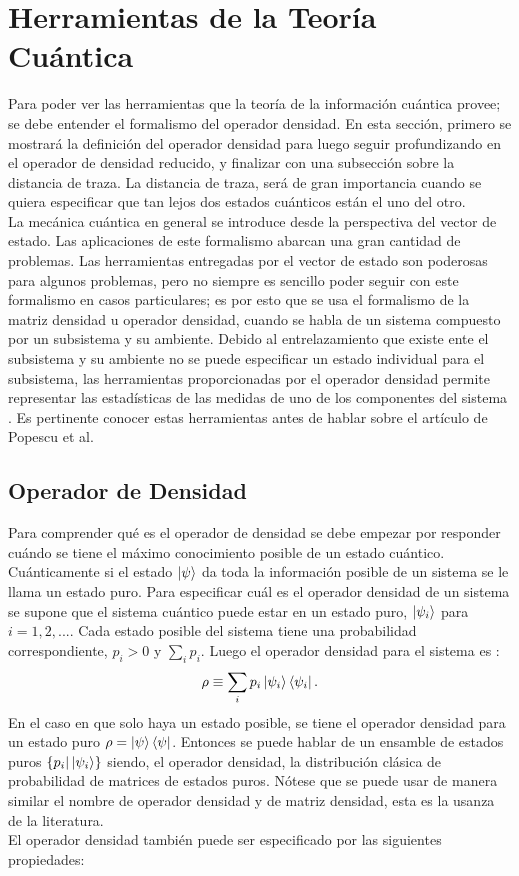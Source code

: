 \section{Herramientas de la Teoría Cuántica}
Para poder ver las herramientas que la teoría de la información cuántica provee; se debe entender el formalismo del operador densidad. En esta sección, primero se mostrará la definición del operador densidad para luego seguir profundizando en el operador de densidad reducido, y finalizar con una subsección sobre la distancia de traza. La distancia de traza, será de gran importancia cuando se quiera especificar que tan lejos dos estados cuánticos están el uno del otro. \\
La mecánica cuántica en general se introduce desde la perspectiva del vector de estado. Las aplicaciones de este formalismo abarcan una gran cantidad de problemas. Las herramientas entregadas por el vector de estado son poderosas para algunos problemas, pero no siempre es sencillo poder seguir con este formalismo en casos particulares; es por esto que se usa el formalismo de la matriz densidad u operador densidad, cuando se habla de un sistema compuesto por un subsistema y su ambiente. Debido al entrelazamiento que existe ente el subsistema y su ambiente no se puede especificar un estado individual para el subsistema, las herramientas proporcionadas por el operador densidad permite representar las estadísticas de las medidas de uno de los componentes del sistema \cite{Decoherence}. Es pertinente conocer estas herramientas antes de hablar sobre el artículo de Popescu et al.
\\
\subsection{Operador de Densidad}
Para comprender qué es el operador de densidad se debe empezar por responder cuándo se tiene el máximo conocimiento posible de un estado cuántico. Cuánticamente si el estado $\ket{\psi}$ da toda la información posible de un sistema se le llama un estado puro. Para especificar cuál es el operador densidad de un sistema se supone que el sistema cuántico puede estar en un estado puro, $\ket{\psi_{i}}$ para $i=1,2,...$. Cada estado posible del sistema tiene una probabilidad correspondiente, $p_{i}>0$ y $\sum_{i} p_{i}$. Luego el operador densidad para el sistema es :
\begin{equation}
\rho \equiv \sum_{i} p_{i} \ket{\psi_{i}}\bra{\psi_{i}}.
\end{equation}
En el caso en que solo haya un estado posible, se tiene el operador densidad para un estado puro $\rho= \ket{\psi}\bra{\psi}$. Entonces se puede hablar de un ensamble de estados puros $ \{ p_{i} | \ket{\psi_{i}} \} $  siendo, el operador densidad, la distribución clásica de probabilidad de matrices de estados puros. Nótese que se puede usar de manera similar el nombre de operador densidad y de matriz densidad, esta es la usanza de la literatura. 
\\
El operador densidad también puede ser especificado por las siguientes propiedades: 

